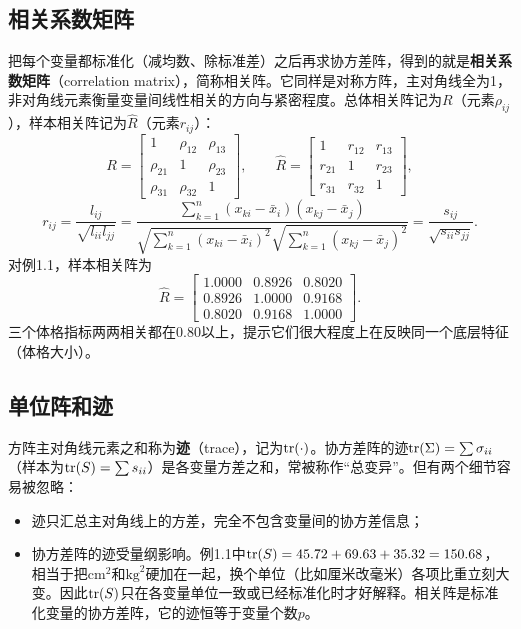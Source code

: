 \subsection{相关系数矩阵}
把每个变量都标准化（减均数、除标准差）之后再求协方差阵，得到的就是\textbf{相关系数矩阵}（correlation matrix），简称相关阵。它同样是对称方阵，主对角线全为1，非对角线元素衡量变量间线性相关的方向与紧密程度。总体相关阵记为$R$（元素$\rho_{ij}$），样本相关阵记为$\widehat R$（元素$r_{ij}$）：
\[
R=\begin{bmatrix}1&\rho_{12}&\rho_{13}\\\rho_{21}&1&\rho_{23}\\\rho_{31}&\rho_{32}&1\end{bmatrix},
\qquad
\widehat R=\begin{bmatrix}1&r_{12}&r_{13}\\r_{21}&1&r_{23}\\r_{31}&r_{32}&1\end{bmatrix},
\]
\[
r_{ij}=\frac{l_{ij}}{\sqrt{l_{ii}l_{jj}}}
=\frac{\sum_{k=1}^{n}(x_{ki}-\bar x_i)(x_{kj}-\bar x_j)}
{\sqrt{\sum_{k=1}^{n}(x_{ki}-\bar x_i)^2}
\sqrt{\sum_{k=1}^{n}(x_{kj}-\bar x_j)^2}}
=\frac{s_{ij}}{\sqrt{s_{ii}s_{jj}}}.
\]
对例1.1，样本相关阵为
\[
\widehat R=\begin{bmatrix}1.0000&0.8926&0.8020\\0.8926&1.0000&0.9168\\0.8020&0.9168&1.0000\end{bmatrix}.
\]
三个体格指标两两相关都在0.80以上，提示它们很大程度上在反映同一个底层特征（体格大小）。

\subsection{单位阵和迹}
方阵主对角线元素之和称为\textbf{迹}（trace），记为$\operatorname{tr}(\cdot)$。协方差阵的迹$\operatorname{tr}(\Sigma)=\sum\sigma_{ii}$（样本为$\operatorname{tr}(S)=\sum s_{ii}$）是各变量方差之和，常被称作“总变异”。但有两个细节容易被忽略：
\begin{itemize}
\item 迹只汇总主对角线上的方差，完全不包含变量间的协方差信息；
\item 协方差阵的迹受量纲影响。例1.1中$\operatorname{tr}(S)=45.72+69.63+35.32=150.68$，相当于把$\mathrm{cm}^2$和$\mathrm{kg}^2$硬加在一起，换个单位（比如厘米改毫米）各项比重立刻大变。因此$\operatorname{tr}(S)$只在各变量单位一致或已经标准化时才好解释。相关阵是标准化变量的协方差阵，它的迹恒等于变量个数$p$。
\end{itemize}

